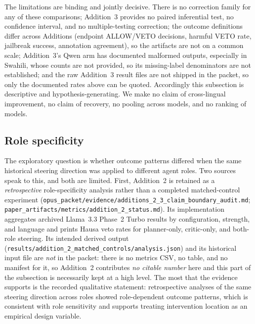 The limitations are binding and jointly decisive. There is no correction family
for any of these comparisons; Addition~3 provides no paired inferential test, no
confidence interval, and no multiple-testing correction; the outcome definitions
differ across Additions (endpoint ALLOW/VETO decisions, harmful VETO rate,
jailbreak success, annotation agreement), so the artifacts are not on a common
scale; Addition~3's Qwen arm has documented malformed outputs, especially in
Swahili, whose counts are not provided, so its missing-label denominators are
not established; and the raw Addition~3 result files are not shipped in the
packet, so only the documented rates above can be quoted. Accordingly this
subsection is descriptive and hypothesis-generating. We make no claim of
cross-lingual improvement, no claim of recovery, no pooling across models, and
no ranking of models.

\subsection{Role specificity}

The exploratory question is whether outcome patterns differed when the same
historical steering direction was applied to different agent roles. Two sources
speak to this, and both are limited. First, Addition~2 is retained as a
\emph{retrospective} role-specificity analysis rather than a completed
matched-control experiment
(\texttt{opus\_packet/evidence/additions\_2\_3\_claim\_boundary\_audit.md};
\texttt{paper\_artifacts/metrics/addition\_2\_status.md}). Its implementation
aggregates archived Llama~3.3 Phase~2 Turbo results by configuration, strength,
and language and prints Hausa veto rates for planner-only, critic-only, and
both-role steering. Its intended derived output
(\texttt{results/addition\_2\_matched\_controls/analysis.json}) and its
historical input file are \emph{not} in the packet: there is no metrics CSV, no
table, and no manifest for it, so Addition~2 contributes \emph{no citable
number} here and this part of the subsection is necessarily kept at a high
level. The most that the evidence supports is the recorded qualitative
statement: retrospective analyses of the same steering direction across roles
showed role-dependent outcome patterns, which is consistent with role
sensitivity and supports treating intervention location as an empirical design
variable.

